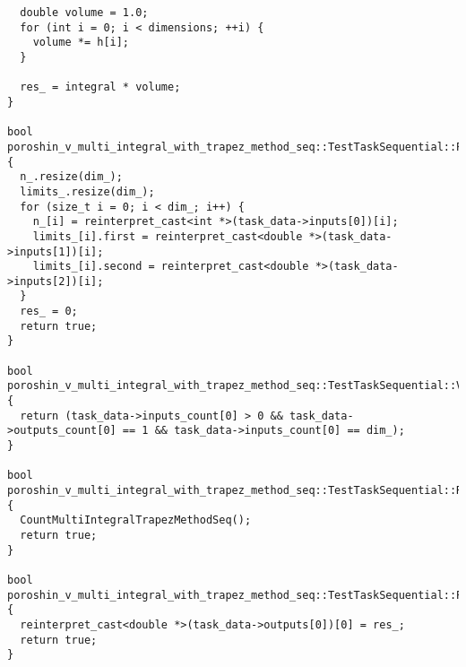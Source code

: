 \documentclass[12pt]{article}
\begin{document}
\begin{lstlisting}
  double volume = 1.0;
  for (int i = 0; i < dimensions; ++i) {
    volume *= h[i];
  }

  res_ = integral * volume;
}

bool poroshin_v_multi_integral_with_trapez_method_seq::TestTaskSequential::PreProcessingImpl() {
  n_.resize(dim_);
  limits_.resize(dim_);
  for (size_t i = 0; i < dim_; i++) {
    n_[i] = reinterpret_cast<int *>(task_data->inputs[0])[i];
    limits_[i].first = reinterpret_cast<double *>(task_data->inputs[1])[i];
    limits_[i].second = reinterpret_cast<double *>(task_data->inputs[2])[i];
  }
  res_ = 0;
  return true;
}

bool poroshin_v_multi_integral_with_trapez_method_seq::TestTaskSequential::ValidationImpl() {
  return (task_data->inputs_count[0] > 0 && task_data->outputs_count[0] == 1 && task_data->inputs_count[0] == dim_);
}

bool poroshin_v_multi_integral_with_trapez_method_seq::TestTaskSequential::RunImpl() {
  CountMultiIntegralTrapezMethodSeq();
  return true;
}

bool poroshin_v_multi_integral_with_trapez_method_seq::TestTaskSequential::PostProcessingImpl() {
  reinterpret_cast<double *>(task_data->outputs[0])[0] = res_;
  return true;
}
\end{lstlisting}
\end{document}

